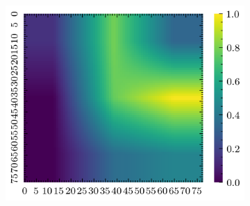 \documentclass[../document.tex]{subfiles}
\begin{document}
\begin{figure}[H]
\begin{subfigure}[b]{0.19\textwidth}
        \includegraphics[width=\linewidth]{../img/5/quarry/false_positive/grad-cam-2d-4.png}
    \end{subfigure}  


\end{figure}
\end{document}
